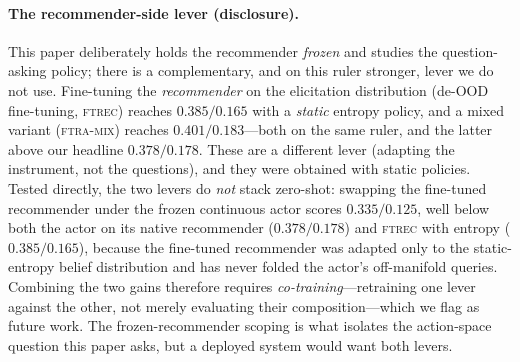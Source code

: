 \documentclass[11pt]{article}
\begin{document}
\paragraph{The recommender-side lever (disclosure).} This paper deliberately holds the recommender \emph{frozen} and
studies the question-asking policy; there is a complementary, and on this ruler stronger, lever we do not use.
Fine-tuning the \emph{recommender} on the elicitation distribution (de-OOD fine-tuning, \textsc{ftrec}) reaches
$0.385/0.165$ with a \emph{static} entropy policy, and a mixed variant (\textsc{ftra-mix}) reaches $0.401/0.183$---both
on the same ruler, and the latter above our headline $0.378/0.178$. These are a different lever (adapting the
instrument, not the questions), and they were obtained with static policies. Tested directly, the two levers do
\emph{not} stack zero-shot: swapping the fine-tuned recommender under the frozen continuous actor scores $0.335/0.125$,
well below both the actor on its native recommender ($0.378/0.178$) and \textsc{ftrec} with entropy ($0.385/0.165$),
because the fine-tuned recommender was adapted only to the static-entropy belief distribution and has never folded the
actor's off-manifold queries. Combining the two gains therefore requires \emph{co-training}---retraining one lever
against the other, not merely evaluating their composition---which we flag as future work. The frozen-recommender
scoping is what isolates the action-space question this paper asks, but a deployed system would want both levers.

\end{document}

